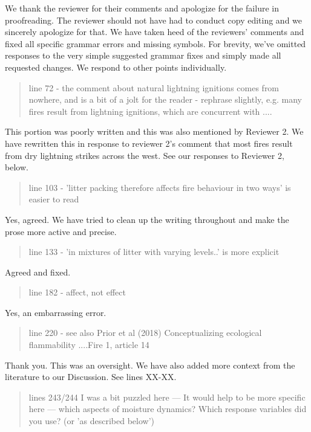 \documentclass[letterpaper, 12pt]{letter}
\begin{document}
\begin{letter}{}
We thank the reviewer for their comments and apologize for the failure in
proofreading. The reviewer should not have had to conduct copy editing and we
sincerely apologize for that. We have taken heed of the reviewers' comments and
fixed all specific grammar errors and missing symbols. For brevity, we've
omitted responses to the very simple suggested grammar fixes and simply made all
requested changes. We respond to other points individually.

\begin{quote}
line 72 - the comment about natural lightning ignitions comes from nowhere, and is a  bit of a jolt for the reader - rephrase slightly, e.g. many fires result from lightning ignitions, which are concurrent with ....
\end{quote}

This portion was poorly written and this was also mentioned by Reviewer 2. We have rewritten this in response to reviewer 2's comment that most fires result from dry lightning strikes across the west. See our responses to Reviewer 2, below.

\begin{quote}
line 103 - 'litter packing therefore affects fire behaviour in two ways' is easier to read
\end{quote}

Yes, agreed. We have tried to clean up the writing throughout and make the prose more active and precise.

\begin{quote}
line 133 - 'in mixtures of litter with varying levels..' is more explicit
\end{quote}

Agreed and fixed.

\begin{quote}
line 182 - affect, not effect
\end{quote}

Yes, an embarrassing error.

\begin{quote}
line 220 - see also Prior et al (2018)  Conceptualizing ecological flammability ....Fire 1, article 14
\end{quote}

Thank you. This was an oversight. We have also added more context from the
literature to our Discussion. See lines XX-XX.


\begin{quote}
lines 243/244 I was a bit puzzled here --- It would help to be more specific here --- which aspects of moisture dynamics? Which response variables did you use?  (or 'as described below')
\end{quote}


\end{letter}
\end{document}
